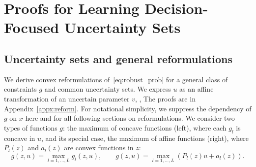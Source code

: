 \chapter{Proofs for Learning Decision-Focused Uncertainty Sets}
\label{app:lro}

\section{Uncertainty sets and general reformulations}
\label{appx:gen_sets}
We derive convex reformulations of~\eqref{eq:robust_prob} for a general class of constraints $g$ and common uncertainty sets. 
We express $u$ as an affine transformation of an uncertain parameter $v$, \ie, 
The proofs are in
Appendix~\ref{appx:reform}.
For notational simplicity, we suppress the dependency of $g$ on $x$ here and for all following sections on reformulations.
We consider two types of functions $g$: the maximum of concave functions (left), where each $g_l$ is concave in $u$, and its special case, the maximum of affine functions (right), where $P_l(z)$ and $a_l(z)$ are convex functions in $z$:
$$g(z,u) = \max_{l=1,\dots,L} g_l(z,u), \qquad g(z,u) = \max_{l=1,\dots,L} (P_l(z)u + a_l(z)).$$

